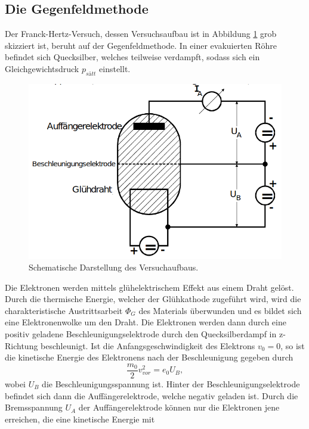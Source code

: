 \subsection{Die Gegenfeldmethode}
\label{sec:gegen}
Der Franck-Hertz-Versuch, dessen Versuchsaufbau ist in Abbildung \ref{fig:skizze} grob skizziert ist, beruht auf der Gegenfeldmethode.
In einer evakuierten Röhre befindet sich Quecksilber, welches teilweise verdampft, sodass sich ein Gleichgewichtsdruck $p_{sätt}$ 
einstellt. 
\begin{figure}[H]
    \centering
    \includegraphics[scale = 0.5]{pictures/Aufbau1.png}
    \caption{Schematische Darstellung des Versuchaufbaus. \cite{AP01}}
    \label{fig:skizze}
\end{figure}
Die Elektronen werden mittels glühelektrischem Effekt aus einem Draht gelöst. Durch die thermische Energie, welcher der 
Glühkathode zugeführt wird, wird die charakteristische Austrittsarbeit $\Phi_G$ des Materials überwunden und es bildet sich eine 
Elektronenwolke um den Draht. Die Elektronen werden dann durch eine positiv geladene Beschleunigungselektrode durch den Quecksilberdampf 
in z-Richtung beschleunigt. Ist die Anfangsgeschwindigkeit des Elektrons $v_0=0$, so ist die kinetische Energie des Elektronens nach der 
Beschleunigung gegeben durch
\begin{equation*}
    \frac{m_0}{2}v_{vor}^2=e_0U_B   ,
\end{equation*}
wobei $U_B$ die Beschleunigungsspannung ist.
Hinter der Beschleunigungselektrode befindet sich dann die Auffängerelektrode, welche negativ geladen ist. Durch die Bremsspannung
$U_A$ der Auffängerelektrode können nur die Elektronen jene erreichen, die eine kinetische Energie mit  
